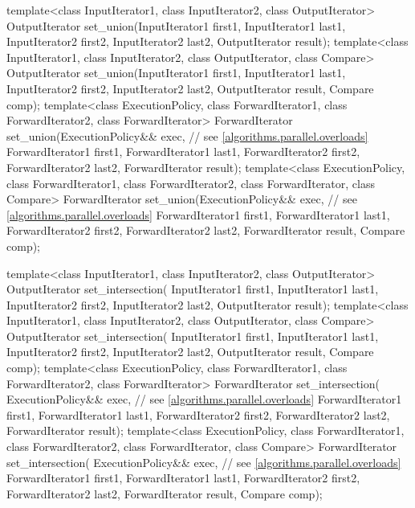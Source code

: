 \begin{codeblock}
{  template<class InputIterator1, class InputIterator2, class OutputIterator>
    OutputIterator set_union(InputIterator1 first1, InputIterator1 last1,
                             InputIterator2 first2, InputIterator2 last2,
                             OutputIterator result);
  template<class InputIterator1, class InputIterator2, class OutputIterator, class Compare>
    OutputIterator set_union(InputIterator1 first1, InputIterator1 last1,
                             InputIterator2 first2, InputIterator2 last2,
                             OutputIterator result, Compare comp);
  template<class ExecutionPolicy, class ForwardIterator1, class ForwardIterator2,
           class ForwardIterator>
    ForwardIterator set_union(ExecutionPolicy&& exec, // see \ref{algorithms.parallel.overloads}
                             ForwardIterator1 first1, ForwardIterator1 last1,
                             ForwardIterator2 first2, ForwardIterator2 last2,
                             ForwardIterator result);
  template<class ExecutionPolicy, class ForwardIterator1, class ForwardIterator2,
           class ForwardIterator, class Compare>
    ForwardIterator set_union(ExecutionPolicy&& exec, // see \ref{algorithms.parallel.overloads}
                             ForwardIterator1 first1, ForwardIterator1 last1,
                             ForwardIterator2 first2, ForwardIterator2 last2,
                             ForwardIterator result, Compare comp);

  template<class InputIterator1, class InputIterator2, class OutputIterator>
    OutputIterator set_intersection(
      InputIterator1 first1, InputIterator1 last1,
      InputIterator2 first2, InputIterator2 last2,
      OutputIterator result);
  template<class InputIterator1, class InputIterator2, class OutputIterator, class Compare>
    OutputIterator set_intersection(
      InputIterator1 first1, InputIterator1 last1,
      InputIterator2 first2, InputIterator2 last2,
      OutputIterator result, Compare comp);
  template<class ExecutionPolicy, class ForwardIterator1, class ForwardIterator2,
           class ForwardIterator>
    ForwardIterator set_intersection(
      ExecutionPolicy&& exec, // see \ref{algorithms.parallel.overloads}
      ForwardIterator1 first1, ForwardIterator1 last1,
      ForwardIterator2 first2, ForwardIterator2 last2,
      ForwardIterator result);
  template<class ExecutionPolicy, class ForwardIterator1, class ForwardIterator2,
           class ForwardIterator, class Compare>
    ForwardIterator set_intersection(
      ExecutionPolicy&& exec, // see \ref{algorithms.parallel.overloads}
      ForwardIterator1 first1, ForwardIterator1 last1,
      ForwardIterator2 first2, ForwardIterator2 last2,
      ForwardIterator result, Compare comp);

}
\end{codeblock}
